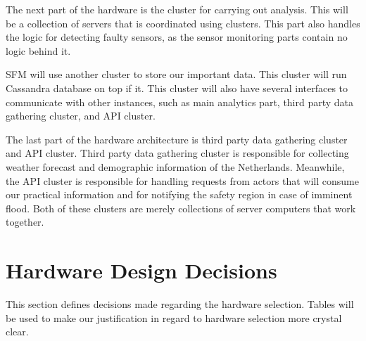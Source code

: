 The next part of the hardware is the cluster for carrying out analysis. This will be a collection of servers that is coordinated using clusters. This part also handles the logic for detecting faulty sensors, as the sensor monitoring parts contain no logic behind it.

SFM will use another cluster to store our important data. This cluster will run Cassandra database on top if it. This cluster will also have several interfaces to communicate with other instances, such as main analytics part, third party data gathering cluster, and API cluster.

The last part of the hardware architecture is third party data gathering cluster and API cluster. Third party data gathering cluster is responsible for collecting weather forecast and demographic information of the Netherlands. Meanwhile, the API cluster is responsible for handling requests from actors that will consume our practical information and for notifying the safety region in case of imminent flood. Both of these clusters are merely collections of server computers that work together.

\section{Hardware Design Decisions}
\label{sec:hardware-decisions}
This section defines decisions made regarding the hardware selection. Tables will be used to make our justification in regard to hardware selection more crystal clear.

